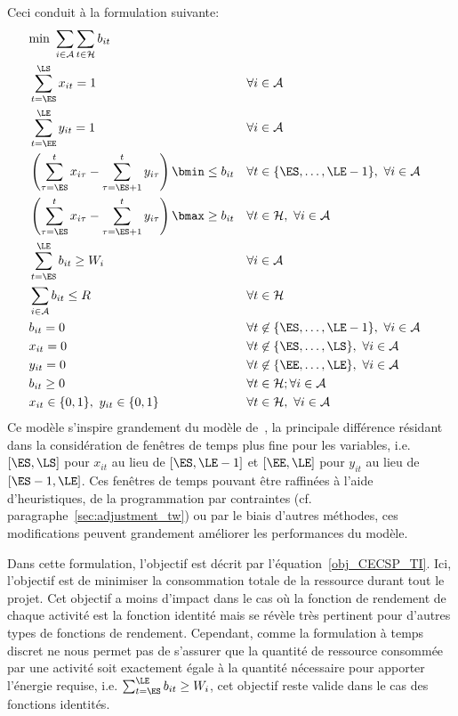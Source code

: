 Ceci conduit à la formulation suivante:
{\small
 \begin{align} &\text{min }
\sum_{i\in \A}\sum_{t \in \H} b_{it}
\label{obj_CECSP_TI}\\ &\sum_{t=\ES}^{\LS} x_{it} = 1 & &\forall i
\in \A \label{start_CECSP_TI}\\ &\sum_{t=\EE}^{\LE} y_{it} =
1 & & \forall i \in \A
\label{end_CECSP_TI}\\&\left(\sum_{\tau=\ES}^{t} x_{i\tau}
-\sum_{\tau=\ES+1}^{t} y_{i\tau}\right)\bmin \le b_{it} & &
\forall t \in \{\ES,\dots,\LE-1\},\ \forall i \in \A
\label{bmin_CECSP_TI}\\ &\left(\sum_{\tau=\ES}^{t} x_{i\tau} -
\sum_{\tau=\ES+1}^{t} y_{i\tau}\right)\bmax\ge b_{it}& & \forall t
\in \H ,\ \forall i \in \A \label{bmax_CECSP_TI}\\
&\sum_{t=\ES}^{\LE} b_{it} \ge W_i & & \forall i \in \A
\label{nrj_CECSP_TI}\\ &\sum_{i \in \A} b_{it} \le R & &
\forall t \in \H \label{res_CECSP_TI}\\ &b_{it} = 0 & &
\forall t \not\in \{\ES,\dots,\LE-1\},\ \forall i \in \A
\label{consNul_CECSP_TI}\\ &x_{it} = 0 & & \forall t \not\in
\{\ES,\dots,\LS\},\ \forall i \in \A \label{twx_CECSP_TI}\\
&y_{it} = 0 & & \forall t \not\in \{\EE,\dots,\LE\},\ \forall i
\in \A \label{twy_CECSP_TI}\\ & b_{it} \ge 0 & & \forall t
\in \H; \forall i \in \A \label{Bb_CECSP_TI}\\
&x_{it}\in \{0,1\},\ y_{it} \in \{0,1\} & & \forall t \in {\cal
H},\ \forall i \in \A \label{Bxy_CECSP_TI} \end{align}
} 
Ce modèle s'inspire grandement du modèle de~\cite{ALR}, la principale
différence résidant dans la considération de fenêtres de temps plus
fine pour les variables, i.e. $[\ES,\LS]$ pour $x_{it}$ au lieu de
$[\ES,\LE-1]$ et $[\EE,\LE]$ pour $y_{it}$ au lieu de
$[\ES-1,\LE]$. Ces fenêtres de temps pouvant être raffinées à l'aide
d'heuristiques, de la programmation par contraintes (cf.
paragraphe~\ref{sec:adjustment_tw}) ou par le biais d'autres méthodes,
ces modifications peuvent grandement améliorer les performances du
modèle.

Dans cette formulation, l'objectif est décrit par
l'équation~\eqref{obj_CECSP_TI}. Ici, l'objectif est de minimiser la
consommation totale de la ressource durant tout le projet. Cet
objectif a moins d'impact dans le cas où la fonction de rendement de
chaque activité est la fonction identité mais se révèle très pertinent
pour d'autres types de fonctions de rendement.  Cependant, comme la
formulation à temps discret ne nous permet pas de s'assurer que la
quantité de ressource consommée par une activité soit exactement égale
à la quantité nécessaire pour apporter l'énergie requise,
i.e. $\sum_{t=\ES}^{\LE} b_{it} \ge W_i$, cet objectif reste valide
dans le cas des fonctions identités.

